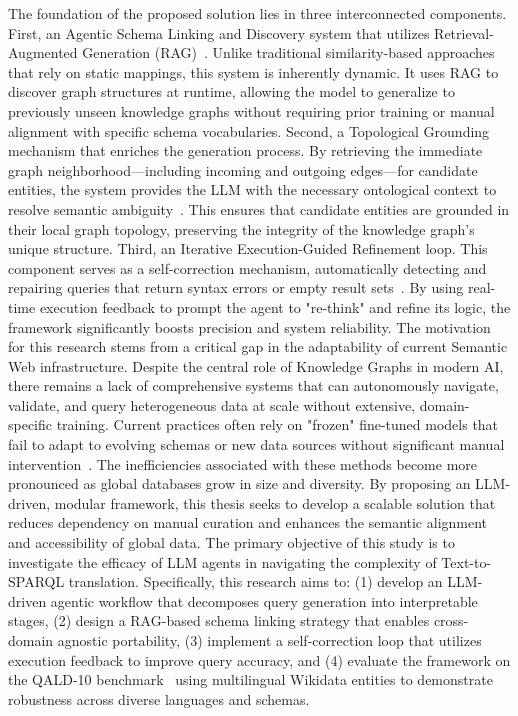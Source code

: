 The foundation of the proposed solution lies in three interconnected components. First, an Agentic Schema Linking and Discovery system that utilizes Retrieval-Augmented Generation (RAG)~\cite{lewis2020rag}. Unlike traditional similarity-based approaches that rely on static mappings, this system is inherently dynamic. It uses RAG to discover graph structures at runtime, allowing the model to generalize to previously unseen knowledge graphs without requiring prior training or manual alignment with specific schema vocabularies.
Second, a Topological Grounding mechanism that enriches the generation process. By retrieving the immediate graph neighborhood—including incoming and outgoing edges—for candidate entities, the system provides the LLM with the necessary ontological context to resolve semantic ambiguity~\cite{ji_retrieval--reasoning_2026}. This ensures that candidate entities are grounded in their local graph topology, preserving the integrity of the knowledge graph's unique structure.
Third, an Iterative Execution-Guided Refinement loop. This component serves as a self-correction mechanism, automatically detecting and repairing queries that return syntax errors or empty result sets~\cite{zhao_agentict2srobust_2025}. By using real-time execution feedback to prompt the agent to "re-think" and refine its logic, the framework significantly boosts precision and system reliability.
The motivation for this research stems from a critical gap in the adaptability of current Semantic Web infrastructure. Despite the central role of Knowledge Graphs in modern AI, there remains a lack of comprehensive systems that can autonomously navigate, validate, and query heterogeneous data at scale without extensive, domain-specific training. Current practices often rely on "frozen" fine-tuned models that fail to adapt to evolving schemas or new data sources without significant manual intervention~\cite{mecharnia_performance_2025}. The inefficiencies associated with these methods become more pronounced as global databases grow in size and diversity. By proposing an LLM-driven, modular framework, this thesis seeks to develop a scalable solution that reduces dependency on manual curation and enhances the semantic alignment and accessibility of global data.
The primary objective of this study is to investigate the efficacy of LLM agents in navigating the complexity of Text-to-SPARQL translation. Specifically, this research aims to: (1) develop an LLM-driven agentic workflow that decomposes query generation into interpretable stages, (2) design a RAG-based schema linking strategy that enables cross-domain agnostic portability, (3) implement a self-correction loop that utilizes execution feedback to improve query accuracy, and (4) evaluate the framework on the QALD-10 benchmark~\cite{usbeck2019benchmarking} using multilingual Wikidata entities to demonstrate robustness across diverse languages and schemas.
